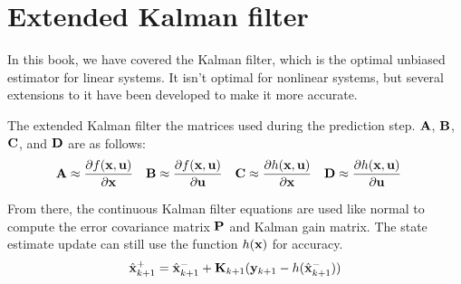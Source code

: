\section{Extended Kalman filter}
\label{sec:ekf}

In this book, we have covered the Kalman filter, which is the optimal unbiased
estimator for linear \glspl{system}. It isn't optimal for nonlinear
\glspl{system}, but several extensions to it have been developed to make it more
accurate.

The extended Kalman filter  the matrices used
during the prediction step. $\mathbf{A}$, $\mathbf{B}$, $\mathbf{C}$, and $\mathbf{D}$ are
 as follows:
\begin{align*}
  \mathbf{A} &\approx
    \frac{\partial f(\mathbf{x}, \mathbf{u})}{\partial \mathbf{x}} &
  \mathbf{B} &\approx
    \frac{\partial f(\mathbf{x}, \mathbf{u})}{\partial \mathbf{u}} &
  \mathbf{C} &\approx
    \frac{\partial h(\mathbf{x}, \mathbf{u})}{\partial \mathbf{x}} &
  \mathbf{D} &\approx
    \frac{\partial h(\mathbf{x}, \mathbf{u})}{\partial \mathbf{u}}
\end{align*}

From there, the continuous Kalman filter equations are used like normal to
compute the error covariance matrix $\mathbf{P}$ and Kalman gain matrix. The
\gls{state} estimate update can still use the function $h(\mathbf{x})$ for
accuracy.
\begin{equation*}
  \hat{\mathbf{x}}_{k+1}^+ = \hat{\mathbf{x}}_{k+1}^- +
    \mathbf{K}_{k+1}(\mathbf{y}_{k+1} - h(\hat{\mathbf{x}}_{k+1}^-))
\end{equation*}
